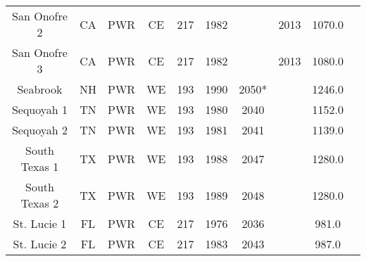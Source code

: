 \begin{table}[H]
\begin{tabular}{c c c c c c c c c c}
    San Onofre 2        & CA & PWR & CE   & 217 & 1982 &      & 2013 & 1070.0\\
    San Onofre 3        & CA & PWR & CE   & 217 & 1982 &      & 2013 & 1080.0\\
    Seabrook            & NH & PWR & WE   & 193 & 1990 & 2050*&      & 1246.0\\
    Sequoyah 1          & TN & PWR & WE   & 193 & 1980 & 2040 &      & 1152.0\\
    Sequoyah 2          & TN & PWR & WE   & 193 & 1981 & 2041 &      & 1139.0\\
    South Texas 1       & TX & PWR & WE   & 193 & 1988 & 2047 &      & 1280.0\\
    South Texas 2       & TX & PWR & WE   & 193 & 1989 & 2048 &      & 1280.0\\
    St. Lucie 1         & FL & PWR & CE   & 217 & 1976 & 2036 &      & 981.0 \\
    St. Lucie 2         & FL & PWR & CE   & 217 & 1983 & 2043 &      & 987.0 \\
    \hline
    \end{tabular}
\end{table}

